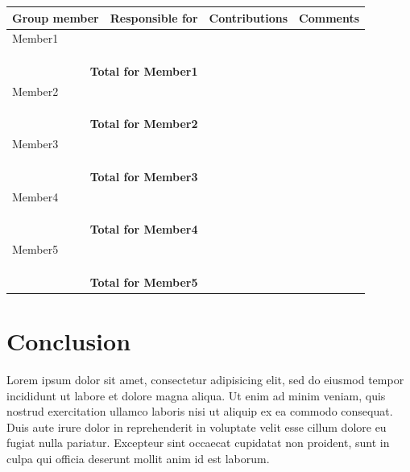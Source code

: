 \documentclass[12pt,a4paper]{article}
\begin{document}
\begin{longtable}{| p{4cm} | p{3.5cm} | p{3.5cm}| p{3.5cm} |}
  \hline
  \textbf{Group member} & \textbf{Responsible for} & \textbf{Contributions} & \textbf{Comments} \\ \hline
  Member1 &  &  & \\ \cline{2-4}
   &  &  & \\ \cline{2-4}
   &  &  & \\ \cline{2-4}
   &  &  & \\ \hline
  \multicolumn{2}{|r|}{\textbf{Total for Member1}}  &  & \\ \hline \hline
  Member2 &  &  & \\ \cline{2-4}
   &  &  & \\ \cline{2-4}
   &  &  & \\ \cline{2-4}
   &  &  & \\ \hline
  \multicolumn{2}{|r|}{\textbf{Total for Member2}}  &  & \\ \hline \hline
  Member3 &  &  & \\ \cline{2-4}
   &  &  & \\ \cline{2-4}
   &  &  & \\ \cline{2-4}
   &  &  & \\ \hline
  \multicolumn{2}{|r|}{\textbf{Total for Member3}}  &  & \\ \hline \hline
  Member4 &  &  & \\ \cline{2-4}
   &  &  & \\ \cline{2-4}
   &  &  & \\ \cline{2-4}
   &  &  & \\ \hline
  \multicolumn{2}{|r|}{\textbf{Total for Member4}}  &  & \\ \hline \hline
  Member5 &  &  & \\ \cline{2-4}
   &  &  & \\ \cline{2-4}
   &  &  & \\ \cline{2-4}
   &  &  & \\ \hline
  \multicolumn{2}{|r|}{\textbf{Total for Member5}}  &  & \\ \hline
\end{longtable}

\section{Conclusion}
Lorem ipsum dolor sit amet, consectetur adipisicing elit, sed do eiusmod tempor incididunt ut labore et dolore magna aliqua. Ut enim ad minim veniam, quis nostrud exercitation ullamco laboris nisi ut aliquip ex ea commodo consequat. Duis aute irure dolor in reprehenderit in voluptate velit esse cillum dolore eu fugiat nulla pariatur. Excepteur sint occaecat cupidatat non proident, sunt in culpa qui officia deserunt mollit anim id est laborum.
\end{document}

